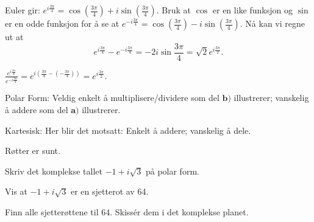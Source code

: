\begin{losning}

\begin{punkt}
Euler gir: $e^{i\frac{3\pi}{4}}=\cos(\frac{3\pi}{4})+i\sin (\frac{3\pi}{4})$. Bruk at $\cos$ er en like funksjon og $\sin$ er en odde funksjon for å se at $e^{-i\frac{3\pi}{4}}=\cos(\frac{3\pi}{4})-i\sin (\frac{3\pi}{4})$. Nå kan vi regne ut at $$e^{i\frac{3\pi}{4}}-e^{-i\frac{3 \pi}{4}}=-2i\sin \frac{3\pi}{4}=\sqrt{2}e^{i\frac{3\pi}{2}}.$$
\end{punkt}

\begin{punkt}
$\frac{e^{i\frac{3\pi}{4}}}{e^{-i\frac{3 \pi}{4}}}=e^{i(\frac{3\pi}{4}-(-\frac{3 \pi}{4}))}=e^{i\frac{3\pi}{2}}.$ 
\end{punkt}

\begin{punkt}
Polar Form: Veldig enkelt å multiplisere/dividere som del $\textbf{b)}$ illustrerer; vanskelig å addere som del $\textbf{a)}$ illustrerer.

\noindent
Kartesisk: Her blir det motsatt: Enkelt å addere; vanskelig å dele.
\end{punkt}

\end{losning}



\begin{oppgave}
Røtter er sunt.
\begin{punkt}
Skriv det komplekse tallet $-1+i\sqrt{3}$ på polar form.
\end{punkt}

\begin{punkt}
Vis at $-1+i\sqrt{3}$ er en sjetterot av 64.
\end{punkt}

\begin{punkt}
Finn alle sjetterøttene til $64$. Skissér dem i det komplekse planet.
\end{punkt}

\end{oppgave}

